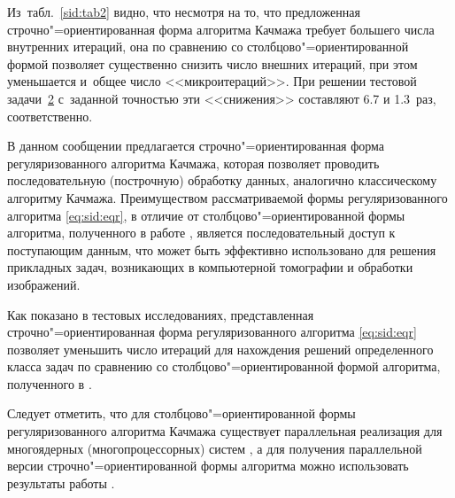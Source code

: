 
Из~табл.~\ref{sid:tab2} видно, что несмотря на то, что предложенная строчно"=ориентированная форма алгоритма Качмажа требует большего числа внутренних итераций,  она по сравнению со столбцово"=ориентированной формой  позволяет существенно снизить число внешних итераций, при этом  уменьшается и~общее число <<микроитераций>>.
При решении тестовой задачи~\hyperlink{sid:test2}{2} с~заданной точностью эти <<снижения>> составляют 6.7 и 1.3~раз, соответственно.



\smallskip

В данном сообщении предлагается строчно"=ориентированная форма регуляризованного алгоритма Качмажа, которая позволяет проводить последовательную (построчную) обработку данных, аналогично классическому алгоритму Качмажа. Преимуществом рассматриваемой формы регуляризованного алгоритма \eqref{eq:sid:eqr}, в отличие от столбцово"=ориентированной формы алгоритма, полученного в работе \cite{zhdanovsid:bib:Ivanov}, является последовательный доступ к поступающим данным, что может быть эффективно использовано для решения прикладных задач, возникающих в компьютерной томографии и обработки изображений.

Как показано в тестовых исследованиях, представленная строчно"=ориентированная форма регуляризованного алгоритма \eqref{eq:sid:eqr} позволяет уменьшить число итераций для нахождения решений определенного класса задач по сравнению со столбцово"=ориентированной формой алгоритма, полученного в \cite{zhdanovsid:bib:Ivanov}.

Следует отметить, что для столбцово"=ориентированной формы регуляризованного алгоритма Качмажа существует параллельная реализация для многоядерных (многопроцессорных) систем \cite{zhdanovsid:bib:ko15}, а для получения параллельной версии строчно"=ориентированной формы алгоритма можно использовать результаты работы \cite{zhdanovsid:bib:liu}.

